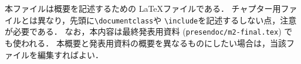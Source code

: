 本ファイルは概要を記述するための \LaTeX ファイルである．
チャプター用ファイルとは異なり，先頭に\texttt{\textbackslash documentclass}や
\texttt{\textbackslash include}を記述するしない点，注意が必要である．
なお，本内容は最終発表用資料 (\texttt{presendoc/m2-final.tex}) でも使われる．
本概要と発表用資料の概要を異なるものにしたい場合は，当該ファイルを編集すればよい．